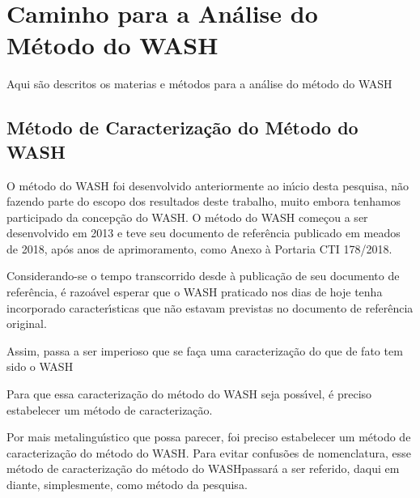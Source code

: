 \documentclass[
12pt,		%
openright,	%
twoside,  %
a4paper,			%
chapter=TITLE,		%
english,			%
french,				%
spanish,			%
brazil				%
]{USPSC-classe/USPSC_RedarTex}
\begin{document}
\section[Caminho para a An\'alise do M\'etodo do WASH]{Caminho para a An\'alise do M\'etodo do WASH}\label{Caminho para a An\'alise do M\'etodo do WASH}
Aqui s\~ao descritos os materias e m\'etodos para a an\'alise do m\'etodo do WASH








\subsection[M\'etodo de Caracteriza\c{c}\~ao do M\'etodo do WASH]{M\'etodo de Caracteriza\c{c}\~ao do M\'etodo do WASH}\label{M\'etodo de Caracteriza\c{c}\~ao do M\'etodo do WASH}
O m\'etodo do WASH foi desenvolvido anteriormente ao in\'{\i}cio desta pesquisa, n\~ao fazendo parte do escopo dos resultados deste trabalho, muito embora tenhamos participado da concep\c{c}\~ao do WASH. O m\'etodo do WASH come\c{c}ou a ser desenvolvido em 2013 e teve seu documento de refer\^encia publicado em meados de 2018, ap\'os anos de aprimoramento, como Anexo \`a Portaria CTI 178/2018.








Considerando-se o tempo transcorrido desde \`a publica\c{c}\~ao de seu documento de refer\^encia, \'e razo\'avel esperar que o WASH praticado nos dias de hoje tenha incorporado caracter\'{\i}sticas que n\~ao estavam previstas no documento de refer\^encia original.








Assim, passa a ser imperioso que se fa\c{c}a uma caracteriza\c{c}\~ao do que de fato tem sido o WASH








Para que essa caracteriza\c{c}\~ao do m\'etodo do WASH seja poss\'{\i}vel, \'e preciso estabelecer um m\'etodo de caracteriza\c{c}\~ao.








Por mais metalingu\'{\i}stico que possa parecer, foi preciso estabelecer um m\'etodo de caracteriza\c{c}\~ao do m\'etodo do WASH. Para evitar confus\~oes de nomenclatura, esse \textquotedbl m\'etodo de caracteriza\c{c}\~ao do m\'etodo do WASH\textquotedbl  passar\'a a ser referido, daqui em diante, simplesmente, como \textquotedbl m\'etodo da pesquisa\textquotedbl .
\end{document}
